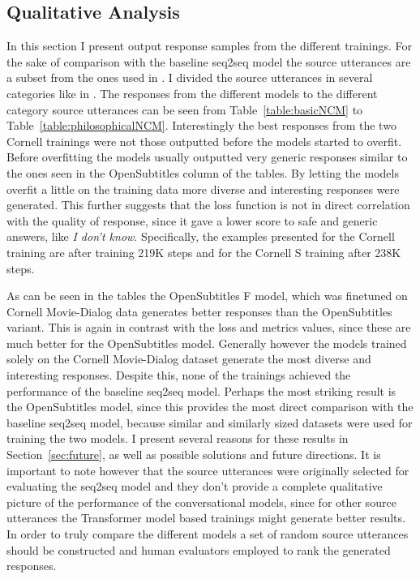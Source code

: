 \documentclass[12pt]{article}
\begin{document}
\subsection{Qualitative Analysis} \label{ssec:52}
In this section I present output response samples from the different trainings. For the sake of comparison with the baseline seq2seq model the source utterances are a subset from the ones used in \cite{Vinyals:2015}. I divided the source utterances in several categories like in \cite{Vinyals:2015}. The responses from the different models to the different category source utterances can be seen from Table~\ref{table:basicNCM} to Table~\ref{table:philosophicalNCM}. Interestingly the best responses from the two Cornell trainings were not those outputted before the models started to overfit. Before overfitting the models usually outputted very generic responses similar to the ones seen in the OpenSubtitles column of the tables. By letting the models overfit a little on the training data more diverse and interesting responses were generated. This further suggests that the loss function is not in direct correlation with the quality of response, since it gave a lower score to safe and generic answers, like \textit{I don't know}. Specifically, the examples presented for the Cornell training are after training 219K steps and for the Cornell S training after 238K steps. 

As can be seen in the tables the OpenSubtitles F model, which was finetuned on Cornell Movie-Dialog data generates better responses than the OpenSubtitles variant. This is again in contrast with the loss and metrics values, since these are much better for the OpenSubtitles model. Generally however the models trained solely on the Cornell Movie-Dialog dataset generate the most diverse and interesting responses. Despite this, none of the trainings achieved the performance of the baseline seq2seq model. Perhaps the most striking result is the OpenSubtitles model, since this provides the most direct comparison with the baseline seq2seq model, because similar and similarly sized datasets were used for training the two models. I present several reasons for these results in Section~\ref{sec:future}, as well as possible solutions and future directions. It is important to note however that the source utterances were originally selected for evaluating the seq2seq model and they don't provide a complete qualitative picture of the performance of the conversational models, since for other source utterances the Transformer model based trainings might generate better results. In order to truly compare the different models a set of random source utterances should be constructed and human evaluators employed to rank the generated responses.
\end{document}
